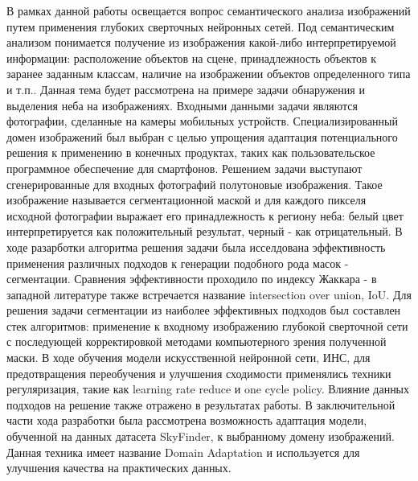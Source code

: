 





\Intro

В рамках данной работы освещается вопрос семантического анализа изображений путем применения глубоких сверточных нейронных сетей. Под семантическим анализом понимается получение из изображения какой-либо интерпретируемой информации: расположение объектов на сцене, принадлежность объектов к заранее заданным классам, наличие на изображении объектов определенного типа и т.п.. Данная тема будет рассмотрена на примере задачи обнаружения и выделения неба на изображениях. Входными данными задачи являются фотографии, сделанные на камеры мобильных устройств. Специализированный домен изображений был выбран с целью упрощения адаптация потенциального решения к применению в конечных продуктах, таких как пользовательское программное обеспечение для смартфонов. Решением задачи выступают сгенерированные для входных фотографий полутоновые изображения. Такое изображение называется сегментационной маской и для каждого пикселя исходной фотографии выражает его принадлежность к региону неба: белый цвет интерпретируется как положительный результат, черный - как отрицательный. В ходе разарботки алгоритма решения задачи была исселдована эффективность применения различных подходов к генерации подобного рода масок - сегментации. Сравнения эффективности проходило по индексу Жаккара - в западной литературе также встречается название intersection over union, IoU. Для решения задачи сегментации из наиболее эффективных подходов был составлен стек алгоритмов: применение к входному изображению глубокой сверточной сети с последующей корректировкой методами компьютерного зрения полученной маски. В ходе обучения модели искусственной нейронной сети, ИНС, для предотвращения переобучения и улучшения сходимости применялись техники регуляризация, такие как learning rate reduce и one cycle policy. Влияние данных подходов на решение также отражено в результатах работы. В заключительной части хода разработки была рассмотрена возможность адаптация модели, обученной на данных датасета SkyFinder, к выбранному домену изображений. Данная техника имеет название Domain Adaptation и используется для улучшения качества на практических данных.

